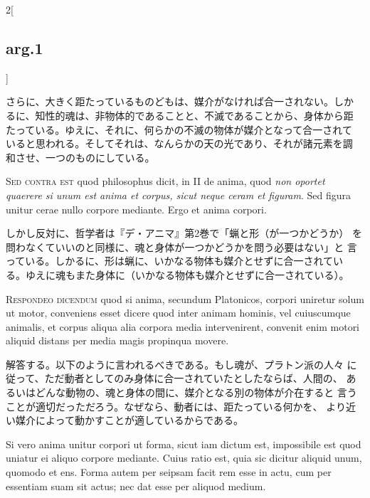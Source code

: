 \documentclass[paper=a4paper,fontsize=10pt,jafontsize=9pt,titlepage]{jlreq}
\begin{document}
\begin{paracol}{2}[\subsection{arg.1}]
\switchcolumn

さらに、大きく距たっているものどもは、媒介がなければ合一されない。しか
るに、知性的魂は、非物体的であることと、不滅であることから、身体から距
たっている。ゆえに、それに、何らかの不滅の物体が媒介となって合一されて
いると思われる。そしてそれは、なんらかの天の光であり、それが諸元素を調
和させ、一つのものにしている。

\switchcolumn*[\subsection{s.c.}]



{\scshape Sed contra est} quod philosophus dicit, in II de anima, quod
{\itshape non oportet quaerere si unum est anima et corpus, sicut
neque ceram et figuram}. Sed figura unitur cerae nullo corpore
mediante. Ergo et anima corpori.

\switchcolumn

しかし反対に、哲学者は『デ・アニマ』第2巻で「蝋と形（が一つかどうか）
を問わなくていいのと同様に、魂と身体が一つかどうかを問う必要はない」と
言っている。しかるに、形は蝋に、いかなる物体も媒介とせずに合一されてい
る。ゆえに魂もまた身体に（いかなる物体も媒介とせずに合一されている）。




 {\scshape Respondeo dicendum} quod si anima, secundum Platonicos,
 corpori uniretur solum ut motor, conveniens esset dicere quod inter
 animam hominis, vel cuiuscumque animalis, et corpus aliqua alia
 corpora media intervenirent, convenit enim motori aliquid distans per
 media magis propinqua movere.

\switchcolumn

 解答する。以下のように言われるべきである。もし魂が、プラトン派の人々
 に従って、ただ動者としてのみ身体に合一されていたとしたならば、人間の、
 あるいはどんな動物の、魂と身体の間に、媒介となる別の物体が介在すると
 言うことが適切だっただろう。なぜなら、動者には、距たっている何かを、
 より近い媒介によって動かすことが適しているからである。

\switchcolumn*



 Si vero anima unitur corpori ut forma, sicut iam dictum est,
 impossibile est quod uniatur ei aliquo corpore mediante. Cuius ratio
 est, quia sic dicitur aliquid unum, quomodo et ens. Forma autem per
 seipsam facit rem esse in actu, cum per essentiam suam sit actus; nec
 dat esse per aliquod medium.


\end{paracol}
\end{document}
